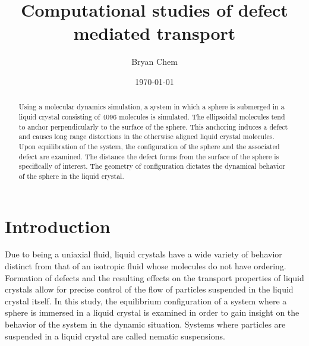 \documentclass[preprint, aps]{revtex4-1}
\begin{document}

\title{Computational studies of defect mediated transport}
\author{Bryan Chem}
\date{\today}

\begin{abstract}
Using a molecular dynamics simulation, a system in which a sphere is submerged 
in a liquid crystal consisting of 4096 molecules is simulated. The ellipsoidal 
molecules tend to anchor perpendicularly to the surface of the sphere. This
anchoring induces a defect and causes long range distortions in the 
otherwise aligned liquid crystal molecules. Upon equilibration of the system, 
the configuration of the sphere and the associated defect are examined. The 
distance the defect forms from the surface of the sphere is specifically of 
interest. The geometry of configuration dictates the dynamical behavior of the 
sphere in the liquid crystal.

\end{abstract}

\maketitle

\tableofcontents

\newpage

\section*{Introduction}
Due to being a uniaxial fluid, liquid crystals have a wide variety of 
behavior distinct from that of an isotropic fluid whose molecules do not have
ordering. Formation of defects and the resulting effects on the transport 
properties of liquid crystals allow for precise control of the flow of particles
suspended in the liquid crystal itself. In this study, the equilibrium
configuration of a system where a sphere is immersed in a liquid crystal is
examined in order to gain insight on the behavior of the system in the dynamic
situation. Systems where particles are suspended in a liquid crystal are called
nematic suspensions. 
\end{document}

